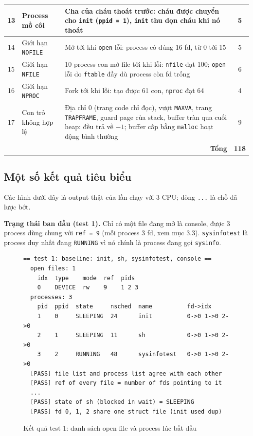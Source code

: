 \begin{longtable}{|c|p{4.2cm}|p{8.6cm}|c|}
13 & Process mồ côi & Cha của cháu thoát trước: cháu được chuyển cho \texttt{init} (\texttt{ppid = 1}), \texttt{init} thu dọn cháu khi nó thoát & 5 \\ \hline
14 & Giới hạn \texttt{NOFILE} & Mở tới khi \texttt{open} lỗi: process có đúng 16 fd, từ 0 tới 15 & 5 \\ \hline
15 & Giới hạn \texttt{NFILE} & 10 process con mở file tới khi lỗi: \texttt{nfile} đạt 100; \texttt{open} lỗi do \texttt{ftable} đầy dù process còn fd trống & 6 \\ \hline
16 & Giới hạn \texttt{NPROC} & Fork tới khi lỗi: tạo được 61 con, \texttt{nproc} đạt 64 & 4 \\ \hline
17 & Con trỏ không hợp lệ & Địa chỉ 0 (trang code chỉ đọc), vượt \texttt{MAXVA}, trang \texttt{TRAPFRAME}, guard page của stack, buffer tràn qua cuối heap: đều trả về $-1$; buffer cấp bằng \texttt{malloc} hoạt động bình thường & 9 \\ \hline
\multicolumn{3}{|r|}{\textbf{Tổng}} & \textbf{118} \\ \hline
\end{longtable}

\subsection{Một số kết quả tiêu biểu}

Các hình dưới đây là output thật của lần chạy với 3 CPU; dòng \texttt{...} là chỗ đã lược bớt.

\textbf{Trạng thái ban đầu (test 1).} Chỉ có một file đang mở là console, được 3 process dùng chung với \texttt{ref = 9} (mỗi process 3 fd, xem mục 3.3). \texttt{sysinfotest} là process duy nhất đang \texttt{RUNNING} vì nó chính là process đang gọi \texttt{sysinfo}.

\begin{figure}[H]
\begin{lstlisting}[style=ketqua]
== test 1: baseline: init, sh, sysinfotest, console ==
  open files: 1
    idx  type    mode  ref  pids
    0    DEVICE  rw    9    1 2 3
  processes: 3
    pid  ppid  state     nsched  name          fd->idx
    1    0     SLEEPING  24      init          0->0 1->0 2->0
    2    1     SLEEPING  11      sh            0->0 1->0 2->0
    3    2     RUNNING   48      sysinfotest   0->0 1->0 2->0
  [PASS] file list and process list agree with each other
  [PASS] ref of every file = number of fds pointing to it
  ...
  [PASS] state of sh (blocked in wait) = SLEEPING
  [PASS] fd 0, 1, 2 share one struct file (init used dup)
\end{lstlisting}
\caption{Kết quả test 1: danh sách open file và process lúc bắt đầu}
\end{figure}

